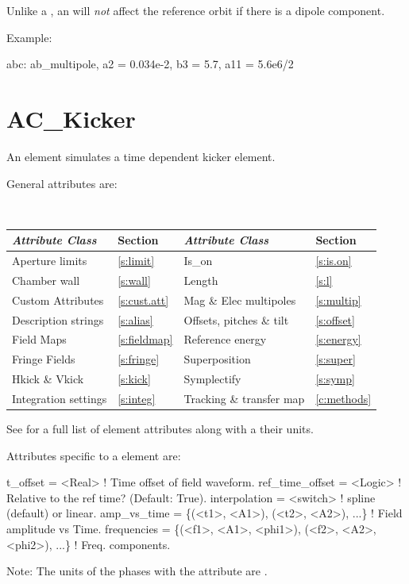 Unlike a , an  will {\em not} affect the
reference orbit if there is a dipole component. 

Example:
\begin{example}
  abc: ab_multipole, a2 = 0.034e-2, b3 = 5.7, a11 = 5.6e6/2
\end{example}

\section{AC_Kicker}
\label{s:ac.kick}

An  element simulates a time dependent kicker element.

General  attributes are:
\begin{center}
\tt
\begin{tabular}{llll} \toprule
  {\sl Attribute Class}      & Section           & {\sl Attribute Class}      & Section         \\ \midrule
  Aperture limits            & \ref{s:limit}     & Is_on                      & \ref{s:is.on}   \\
  Chamber wall               & \ref{s:wall}      & Length                     & \ref{s:l}       \\
  Custom Attributes          & \ref{s:cust.att}  & Mag \& Elec multipoles     & \ref{s:multip}  \\
  Description strings        & \ref{s:alias}     & Offsets, pitches \& tilt   & \ref{s:offset}  \\
  Field Maps                 & \ref{s:fieldmap}  & Reference energy           & \ref{s:energy}  \\ 
  Fringe Fields              & \ref{s:fringe}    & Superposition              & \ref{s:super}   \\
  Hkick \& Vkick             & \ref{s:kick}      & Symplectify                & \ref{s:symp}    \\
  Integration settings       & \ref{s:integ}     & Tracking \& transfer map   & \ref{c:methods} \\
  \bottomrule
\end{tabular}
\end{center}
\toffset
See  for a full list of element attributes along with a their units.

Attributes specific to a  element are:
\begin{example}
  t_offset        = <Real>                         ! Time offset of field waveform.
  ref_time_offset = <Logic>                        ! Relative to the ref time? (Default: True).
  interpolation   = <switch>                       ! spline (default) or linear.
  amp_vs_time = \{(<t1>, <A1>), (<t2>, <A2>), ...\}  ! Field amplitude vs Time.
  frequencies = \{(<f1>, <A1>, <phi1>), (<f2>, <A2>, <phi2>), ...\} ! Freq. components.
\end{example}
Note: The units of the phases  with the  attribute are .

